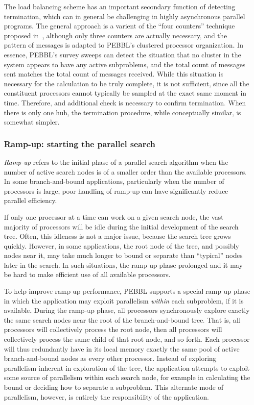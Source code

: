 The load balancing scheme has an important secondary function of
detecting termination, which can in general be challenging in highly
asynchronous parallel programs.  The general approach is a varient of
the ``four counters'' technique proposed in~\cite{Mat87}, although
only three counters are actually necessary, and the pattern of
messages is adapted to PEBBL's clustered processor organization.  
In essence, PEBBL's survey sweeps can detect the situation that no
cluster in the system appears to have any active subproblems, and the
total count of messages sent matches the total count of messages
received.  While this situation is necessary for the calculation to be
truly complete, it is not sufficient, since all the constituent
processors cannot typically be sampled at the exact same moment in
time.  Therefore, and additional check is necessary to confirm
termination.  When there is only one hub, the termination procedure,
while conceptually similar, is somewhat simpler.


\subsubsection{Ramp-up: starting the parallel search}
\label{sec:rampup}
\emph{Ramp-up} refers to the initial phase of a parallel search
algorithm when the number of active search nodes is of a smaller order
than the available processors.  In some branch-and-bound applications,
particularly when the number of processors is large, poor handling of
ramp-up can have significantly reduce parallel efficiency.

If only one processor at a time can work on a given search node, the
vast majority of processors will be idle during the initial
development of the search tree.  Often, this idleness is not a major
issue, because the search tree grows quickly.  However, in some
applications, the root node of the tree, and possibly nodes near
it, may take much longer to bound or separate than ``typical'' nodes
later in the search.  In such situations, the ramp-up phase prolonged 
and it may be hard to make efficient use of all available
processors.

To help improve ramp-up performance, PEBBL supports a special
ramp-up phase in which the application may exploit parallelism
\emph{within} each subproblem, if it is available.  During the ramp-up
phase, all processors synchronously explore exactly the same search
nodes near the root of the branch-and-bound tree.  That is, all
processors will collectively process the root node, then all
processors will collectively process the same child of that root node,
and so forth.  Each processor will thus redundantly have in its local
memory exactly the same pool of active branch-and-bound nodes as every
other processor.  Instead of exploring parallelism inherent in
exploration of the tree, the application attempts to exploit some
source of parallelism within each search node, for example in
calculating the bound or deciding how to separate a subproblem.  This
alternate mode of parallelism, however, is entirely the responsibility
of the application.


